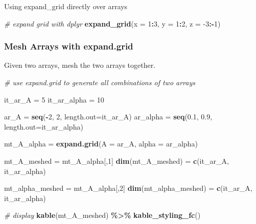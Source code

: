 \documentclass[
]{book}
\newenvironment{Shaded}{\begin{snugshade}}{\end{snugshade}}
\newcommand{\CommentTok}[1]{\textcolor[rgb]{0.56,0.35,0.01}{\textit{#1}}}
\newcommand{\DataTypeTok}[1]{\textcolor[rgb]{0.13,0.29,0.53}{#1}}
\newcommand{\DecValTok}[1]{\textcolor[rgb]{0.00,0.00,0.81}{#1}}
\newcommand{\FloatTok}[1]{\textcolor[rgb]{0.00,0.00,0.81}{#1}}
\newcommand{\KeywordTok}[1]{\textcolor[rgb]{0.13,0.29,0.53}{\textbf{#1}}}
\newcommand{\NormalTok}[1]{#1}
\newcommand{\OperatorTok}[1]{\textcolor[rgb]{0.81,0.36,0.00}{\textbf{#1}}}
\newcommand{\StringTok}[1]{\textcolor[rgb]{0.31,0.60,0.02}{#1}}
\begin{document}
Using expand\_grid directly over arrays

\begin{Shaded}
\begin{Highlighting}[]
\CommentTok{\# expand grid with dplyr}
\KeywordTok{expand\_grid}\NormalTok{(}\DataTypeTok{x =} \DecValTok{1}\OperatorTok{:}\DecValTok{3}\NormalTok{, }\DataTypeTok{y =} \DecValTok{1}\OperatorTok{:}\DecValTok{2}\NormalTok{, }\DataTypeTok{z =} \DecValTok{{-}3}\OperatorTok{:{-}}\DecValTok{1}\NormalTok{)}
\end{Highlighting}
\end{Shaded}

\hypertarget{mesh-arrays-with-expand.grid}{%
\subsubsection{Mesh Arrays with expand.grid}\label{mesh-arrays-with-expand.grid}}

Given two arrays, mesh the two arrays together.

\begin{Shaded}
\begin{Highlighting}[]
\CommentTok{\# use expand.grid to generate all combinations of two arrays}

\NormalTok{it\_ar\_A =}\StringTok{ }\DecValTok{5}
\NormalTok{it\_ar\_alpha =}\StringTok{ }\DecValTok{10}

\NormalTok{ar\_A =}\StringTok{ }\KeywordTok{seq}\NormalTok{(}\OperatorTok{{-}}\DecValTok{2}\NormalTok{, }\DecValTok{2}\NormalTok{, }\DataTypeTok{length.out=}\NormalTok{it\_ar\_A)}
\NormalTok{ar\_alpha =}\StringTok{ }\KeywordTok{seq}\NormalTok{(}\FloatTok{0.1}\NormalTok{, }\FloatTok{0.9}\NormalTok{, }\DataTypeTok{length.out=}\NormalTok{it\_ar\_alpha)}

\NormalTok{mt\_A\_alpha =}\StringTok{ }\KeywordTok{expand.grid}\NormalTok{(}\DataTypeTok{A =}\NormalTok{ ar\_A, }\DataTypeTok{alpha =}\NormalTok{ ar\_alpha)}

\NormalTok{mt\_A\_meshed =}\StringTok{ }\NormalTok{mt\_A\_alpha[,}\DecValTok{1}\NormalTok{]}
\KeywordTok{dim}\NormalTok{(mt\_A\_meshed) =}\StringTok{ }\KeywordTok{c}\NormalTok{(it\_ar\_A, it\_ar\_alpha)}

\NormalTok{mt\_alpha\_meshed =}\StringTok{ }\NormalTok{mt\_A\_alpha[,}\DecValTok{2}\NormalTok{]}
\KeywordTok{dim}\NormalTok{(mt\_alpha\_meshed) =}\StringTok{ }\KeywordTok{c}\NormalTok{(it\_ar\_A, it\_ar\_alpha)}

\CommentTok{\# display}
\KeywordTok{kable}\NormalTok{(mt\_A\_meshed) }\OperatorTok{\%\textgreater{}\%}
\StringTok{  }\KeywordTok{kable\_styling\_fc}\NormalTok{()}
\end{Highlighting}
\end{Shaded}
\end{document}
